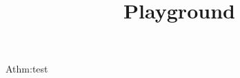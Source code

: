 \documentclass[10pt]{article}
\title{Playground}
\begin{document}
\maketitle

\tableofcontents

\section{}
\lipsum[1]

\begin{TheoremC}{A}{thm:test}
  \lipsum[2]
\end{TheoremC}

\begin{example}
  \lipsum[3]
\end{example}

\begin{remark}
  \lipsum[4]
\end{remark}

\begin{theorem}
  \lipsum[5-10]
\end{theorem}

\lipsum[10-20]
\end{document}
